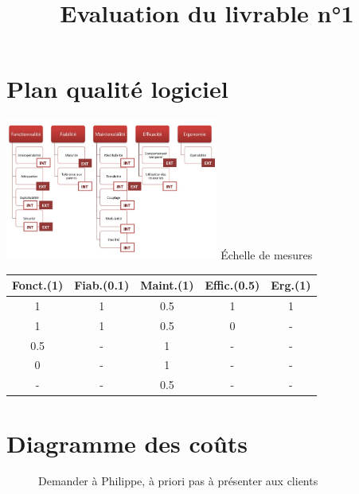 \documentclass{beamer}
\begin{document}
\section{Plan qualit\'e logiciel}
	\begin{frame} {\secname}
		\title{Evaluation du livrable n°1}
\begin{center}	
		\includegraphics[width=7cm]{iso9126}
		Échelle de mesures
		
		\begin{tabular}{|c|c|c|c|c|}
		
			\hline
			Fonct.(1) & Fiab.(0.1) & Maint.(1) & Effic.(0.5) & Erg.(1)\\
			\hline
			1 & 1 & 0.5 & 1 & 1\\
			\hline
			1 & 1 & 0.5 & 0 & - \\
			\hline
			0.5 & - & 1 & - & -\\
			\hline
			0 & - & 1 & - & - \\
			\hline
			- & - & 0.5 & - & - \\
			\hline
		\end{tabular}	
		
		
\end{center}

	\end{frame}




\section{Diagramme des coûts}

\begin{frame}{\secname}
	\begin{figure}
		Demander à Philippe, à priori pas à présenter aux clients
	\end{figure}
\end{frame}
\end{document}

